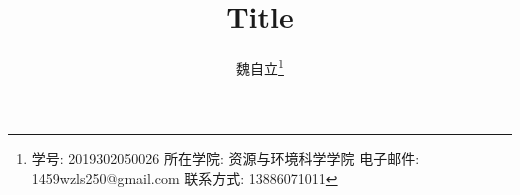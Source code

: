 \title{Title}
\author{魏自立\thanks{
        学号: 2019302050026 \newline
        所在学院: 资源与环境科学学院 \newline
        电子邮件: 1459wzls250@gmail.com \newline
        联系方式: 13886071011
       }
}